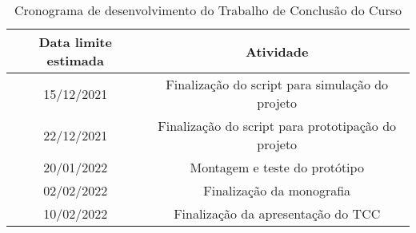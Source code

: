 

\begin{table}[!h]
    \centering
    \begin{tabular}{c|c}
        Data limite estimada & Atividade \\
        \hline
         15/12/2021 & Finalização do script para simulação do projeto\\
         22/12/2021 & Finalização do script para prototipação do projeto\\
         20/01/2022 & Montagem e teste do protótipo\\
         02/02/2022 & Finalização da monografia\\
         10/02/2022 & Finalização da apresentação do TCC\\
    \end{tabular}
    \caption{Cronograma de desenvolvimento do Trabalho de Conclusão do Curso}
    \label{tabt3:params}
\end{table} 